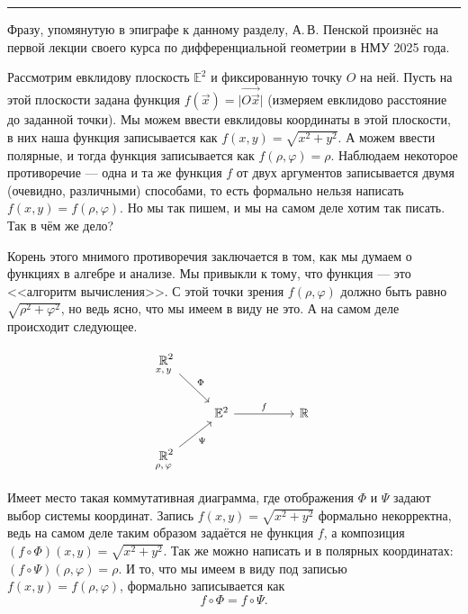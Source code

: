 \medskip
\hrule
\medskip

Фразу, упомянутую в эпиграфе к данному разделу, А.\,В. Пенской произнёс на первой лекции своего курса по дифференциальной геометрии в НМУ 2025 года.

Рассмотрим евклидову плоскость\footnotemark{} $\mathbb{E}^2$ и фиксированную точку $O$ на ней. Пусть на этой плоскости задана функция $f(\vec{x}) = \big|\overrightarrow{O\vec{x}}\big|$ (измеряем евклидово расстояние до заданной точки). Мы можем ввести евклидовы координаты в этой плоскости, в них наша функция записывается как $f(x, y) = \sqrt{x^2 + y^2}$. А можем ввести полярные, и тогда функция записывается как $f(\rho, \varphi) = \rho$. Наблюдаем некоторое противоречие --- одна и та же функция $f$ от двух аргументов записывается двумя (очевидно, различными) способами, то есть формально нельзя написать $f(x, y) = f(\rho, \varphi)$. Но мы так пишем, и мы на самом деле хотим так писать. Так в чём же дело?


Корень этого мнимого противоречия заключается в том, как мы думаем о функциях в алгебре и анализе. Мы привыкли к тому, что функция --- это <<алгоритм вычисления>>. С этой точки зрения $f(\rho, \varphi)$ должно быть равно $\sqrt{\rho^2 + \varphi^2}$, но ведь ясно, что мы имеем в виду не это. А на самом деле происходит следующее.

%
\[\begin{tikzcd}
	{\underset{\mathclap{x,\,y}}{\mathbb{R}}^2} \\
	& {\mathbb{E}^2} && {\mathbb{R}} \\
	{\underset{\mathclap{\rho,\,\varphi}}{\mathbb{R}}^2}
	\arrow["\Phi", from=1-1, to=2-2]
	\arrow["f", from=2-2, to=2-4]
	\arrow["\Psi"', from=3-1, to=2-2]
\end{tikzcd}\]
%

Имеет место такая коммутативная диаграмма, где отображения $\Phi$ и $\Psi$ задают выбор системы координат. Запись $f(x, y) = \sqrt{x^2 + y^2}$ формально некорректна, ведь на самом деле таким образом задаётся не функция $f$, а композиция $(f \circ \Phi)(x, y) = \sqrt{x^2 + y^2}$. Так же можно написать и в полярных координатах: $(f \circ \Psi)(\rho, \varphi) = \rho$. И то, что мы имеем в виду под записью $f(x, y) = f(\rho, \varphi)$, формально записывается как
\[
	f \circ \Phi = f \circ \Psi.
\]

